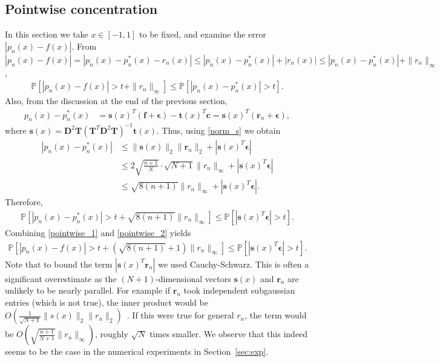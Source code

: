 \documentclass[final,onefignum,onetabnum]{siamart220329}
\newcommand{\vct}[1]{\bm{#1}}
\newcommand{\mtx}[1]{\bm{#1}}
\begin{document}
\subsection{Pointwise concentration}\label{sec:pointwise}
In this section we take $x\in[-1,1]$ to be fixed, and examine the error $|p_n(x)-f(x)|$. 
From $|p_n(x)-f(x)| = |p_n(x)-p_n^*(x)-r_n(x)| \leq |p_n(x)-p_n^*(x)|+|r_n(x)| \leq |p_n(x)-p_n^*(x)|+\| r_n \|_{\infty}$,
\begin{align}
	\mathbb{P}[|p_n(x)-f(x)|>t+\| r_n \|_{\infty}] \leq \mathbb{P}[|p_n(x)-p_n^*(x)|>t]. \label{pointwise_1}
\end{align}
Also, from the discussion at the end of the previous section,
\begin{align*}
	p_n(x)-p_n^*(x) &= \vct{s}(x)^T (\vct{f}+\vct{\epsilon}) - \vct{t}(x)^T \vct{c} = \vct{s}(x)^T (\vct{r}_n+\vct{\epsilon}),
\end{align*}
where $\vct{s}(x)=\mtx{D}^2 \mtx{T} (\mtx{T}^T \mtx{D}^2 \mtx{T})^{-1} \vct{t}(x)$.
Thus, using \eqref{norm_s} we obtain
\begin{align*}
	|p_n(x)-p_n^*(x)| &\leq \| \vct{s}(x) \|_2 \| \vct{r}_n \|_2 +|\vct{s}(x)^T \vct{\epsilon}| \\
	&\leq 2 \sqrt{\frac{n+1}{N}} \cdot \sqrt{N+1} \| r_n \|_{\infty} +|\vct{s}(x)^T \vct{\epsilon}| \\
	&\leq \sqrt{8(n+1)} \| r_n \|_{\infty} +|\vct{s}(x)^T \vct{\epsilon}|.
\end{align*}
Therefore,
\begin{align}
	\mathbb{P}[|p_n(x)-p_n^*(x)|>t+\sqrt{8(n+1)} \| r_n \|_{\infty}] \leq \mathbb{P}[|\vct{s}(x)^T \vct{\epsilon}|>t]. \label{pointwise_2}
\end{align}
Combining \eqref{pointwise_1} and \eqref{pointwise_2} {yields}
\begin{align}
	\mathbb{P}[|p_n(x)-f(x)|>t+(\sqrt{8(n+1)}+1) \| r_n \|_{\infty}] \leq \mathbb{P}[|\vct{s}(x)^T \vct{\epsilon}|>t]. \label{pointwise_3}
\end{align}
Note that 
to bound the term 
$| \vct{s}(x)^T \vct{r}_n |$
we used Cauchy-Schwarz. 
This is often a significant overestimate as the $(N+1)$-dimensional vectors $\vct{s}(x)$ and $\vct{r}_n$ are unlikely to be nearly parallel. For example if $\vct{r}_n$ took independent subgaussian entries (which is not true), 
the inner product 
would be $O(\frac{1}{\sqrt{N+1}} \| s(x)\|_2 \|r_n\|_2)$~\cite{vershynin2018high}. If this were true for general $r_n$, the term would be $O(\sqrt{\frac{n+1}{N+1}} \| r_n\|_{\infty})$, roughly $\sqrt{N}$ times smaller. We observe that this indeed seems to be the case in the numerical experiments in Section~\ref{sec:exp}.
\end{document}
